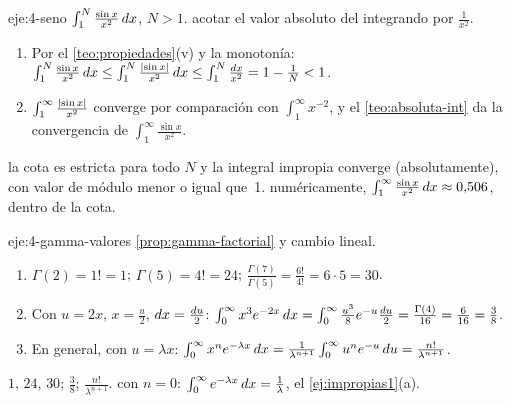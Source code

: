 \begin{solucion}{eje:4-seno}
\datos $\int_1^{N}\frac{\sin x}{x^{2}}\mathop{}\!d x$, $N>1$.
\planteamiento acotar el valor absoluto del integrando por $\frac{1}{x^{2}}$.
\pasos
\begin{enumerate}[label=\arabic*.]
  \item Por el \cref{teo:propiedades}(v) y la monotonía: $\int_1^{N}\frac{\sin x}{x^{2}}\mathop{}\!d x\le\int_1^{N}\frac{\lvert\sin x\rvert}{x^{2}}\mathop{}\!d x\le\int_1^{N}\frac{\mathop{}\!d x}{x^{2}}=1-\frac1N<1$.
  \item $\int_1^{\infty}\frac{\lvert\sin x\rvert}{x^{2}}$ converge por comparación con $\int_1^{\infty}x^{-2}$, y el \cref{teo:absoluta-int} da la convergencia de $\int_1^{\infty}\frac{\sin x}{x^{2}}$.
\end{enumerate}
\resultado la cota es estricta para todo $N$ y la integral impropia converge (absolutamente), con valor de módulo menor o igual que~1.
\comprobacion numéricamente, $\int_1^{\infty}\frac{\sin x}{x^{2}}\mathop{}\!d x\approx0{,}506$, dentro de la cota.
\end{solucion}

\begin{solucion}{eje:4-gamma-valores}
\planteamiento \cref{prop:gamma-factorial} y cambio lineal.
\pasos
\begin{enumerate}[label=\arabic*.]
  \item $\Gamma(2)=1!=1$; $\Gamma(5)=4!=24$; $\frac{\Gamma(7)}{\Gamma(5)}=\frac{6!}{4!}=6\cdot5=30$.
  \item Con $u=2x$, $x=\frac u2$, $\mathop{}\!d x=\frac{\mathop{}\!d u}{2}$: $\int_0^{\infty}x^{3}e^{-2x}\mathop{}\!d x=\int_0^{\infty}\frac{u^{3}}{8}e^{-u}\frac{\mathop{}\!d u}{2}=\frac{\Gamma(4)}{16}=\frac{6}{16}=\frac38$.
  \item En general, con $u=\lambda x$: $\int_0^{\infty}x^{n}e^{-\lambda x}\mathop{}\!d x=\frac{1}{\lambda^{n+1}}\int_0^{\infty}u^{n}e^{-u}\mathop{}\!d u=\frac{n!}{\lambda^{n+1}}$.
\end{enumerate}
\resultado $1$, $24$, $30$; $\frac38$; $\frac{n!}{\lambda^{n+1}}$.
\comprobacion con $n=0$: $\int_0^{\infty}e^{-\lambda x}\mathop{}\!d x=\frac1\lambda$, el \cref{ej:impropias1}(a).
\end{solucion}

